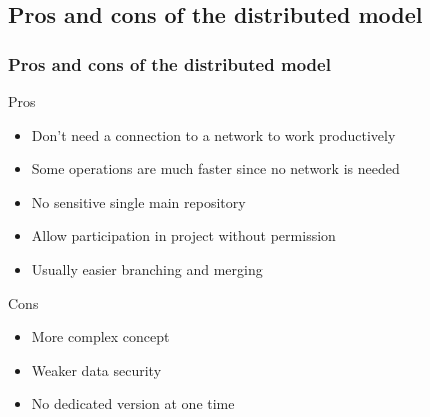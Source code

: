 \documentclass{beamer}
\begin{document}
\subsection{Pros and cons of the distributed model}
\frame
{
  \frametitle{Pros and cons of the distributed model}
  \begin{block}{Pros}
    \begin{itemize}
      \item Don't need a connection to a network to work productively
      \item Some operations are much faster since no network is needed
      \item No sensitive single main repository
      \item Allow participation in project without permission
      \item Usually easier branching and merging
    \end{itemize}
  \end{block}
  \begin{block}{Cons}
    \begin{itemize}
      \item More complex concept
      \item Weaker data security
      \item No dedicated version at one time
    \end{itemize}
  \end{block}

}
\end{document}
